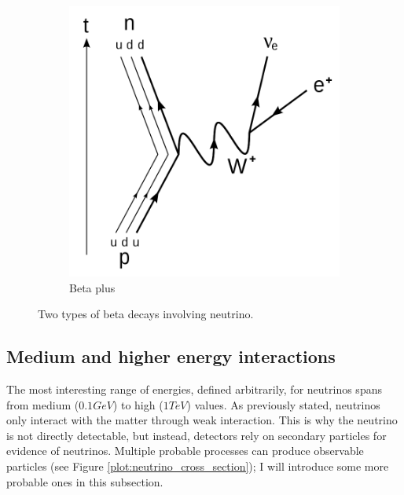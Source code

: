 \begin{figure}[H]
\begin{subfigure}[b]{0.35\textwidth}
    \includegraphics[width=\linewidth]{figures/chapter6/768px-Electron_Capture_Decay.svg.png}
\caption{Beta plus}
   \label{plot:beta_p}
  \end{subfigure}
  \caption[Beta decay]{Two types of beta decays involving neutrino\footnotemark. }

    \label{plot:beta_decays}
\end{figure}


\subsection{Medium and higher energy interactions}


The most interesting range of energies, defined arbitrarily, for neutrinos spans from medium ($0.1 GeV$) to high ($1TeV$) values.
As previously stated, neutrinos only interact with the matter through weak interaction.
This is why the neutrino is not directly detectable, but instead, detectors rely on secondary particles for evidence of neutrinos.
Multiple probable processes can produce observable particles (see Figure \ref{plot:neutrino_cross_section}); I will introduce some more probable ones in this subsection.

